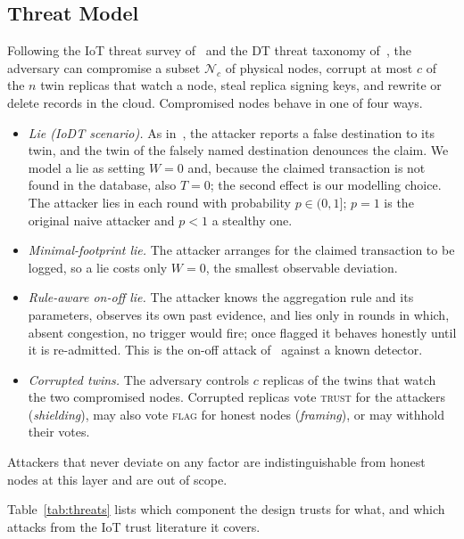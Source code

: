 \documentclass{ieeeaccess}
\begin{document}
\subsection{Threat Model}
\label{subsec:threat}
Following the IoT threat survey of~\cite{neshenko2019demystifying} and
the DT threat taxonomy of~\cite{alcaraz2022digital}, the adversary can
compromise a subset $\mathcal{N}_c$ of physical nodes, corrupt at most
$c$ of the $n$ twin replicas that watch a node, steal replica signing
keys, and rewrite or delete records in the cloud.  Compromised nodes
behave in one of four ways.
\begin{itemize}
\item \emph{Lie (IoDT scenario).}  As in~\cite{soula2024iodt}, the
attacker reports a false destination to its twin, and the twin of the
falsely named destination denounces the claim.  We model a lie as
setting $W=0$ and, because the claimed transaction is not found in the
database, also $T=0$; the second effect is our modelling choice.  The
attacker lies in each round with probability $p\in(0,1]$; $p=1$ is the
original naive attacker and $p<1$ a stealthy one.
\item \emph{Minimal-footprint lie.}  The attacker arranges for the
claimed transaction to be logged, so a lie costs only $W=0$, the
smallest observable deviation.
\item \emph{Rule-aware on-off lie.}  The attacker knows the
aggregation rule and its parameters, observes its own past evidence,
and lies only in rounds in which, absent congestion, no trigger would
fire; once flagged it behaves honestly until it is re-admitted.  This
is the on-off attack of~\cite{sun2006trust} against a known detector.
\item \emph{Corrupted twins.}  The adversary controls $c$ replicas
of the twins that watch the two compromised nodes.  Corrupted replicas
vote \textsc{trust} for the attackers (\emph{shielding}), may also
vote \textsc{flag} for honest nodes (\emph{framing}), or may withhold
their votes.
\end{itemize}
Attackers that never deviate on any factor are indistinguishable from
honest nodes at this layer and are out of scope.

Table~\ref{tab:threats} lists which component the design trusts for
what, and which attacks from the IoT trust literature it covers.
\end{document}
